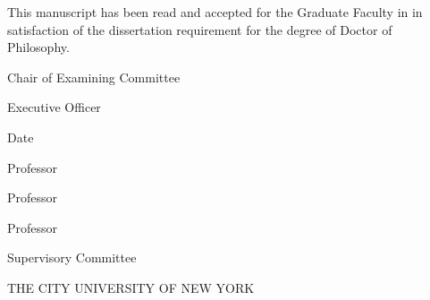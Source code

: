 \clearpage\thispagestyle{empty}
\begin{vplace}
\begin{SingleSpace}

\centering

\noindent This manuscript has been read and accepted for the Graduate Faculty
in \MyDiscipline in satisfaction of the dissertation requirement for the degree
of Doctor of Philosophy.

\vskip 1in
\flushleft

\hrulefill
\newline
\AdviserName
\newline
Chair of Examining Committee
\vspace{0.5in}

\hrulefill
\newline
\EOName
\newline
Executive Officer
\vspace{0.5in}

\hrulefill
\newline
Date
\vspace{0.5in}
\newline

Professor \FirstCommitteeMember \\
\hrulefill

Professor \SecondCommitteeMember \\
\hrulefill

Professor \ThirdCommitteeMember \\
\hrulefill

Supervisory Committee

\vskip 1in
\centering

\MakeUppercase{The City University of New York}

\end{SingleSpace}
\end{vplace}
